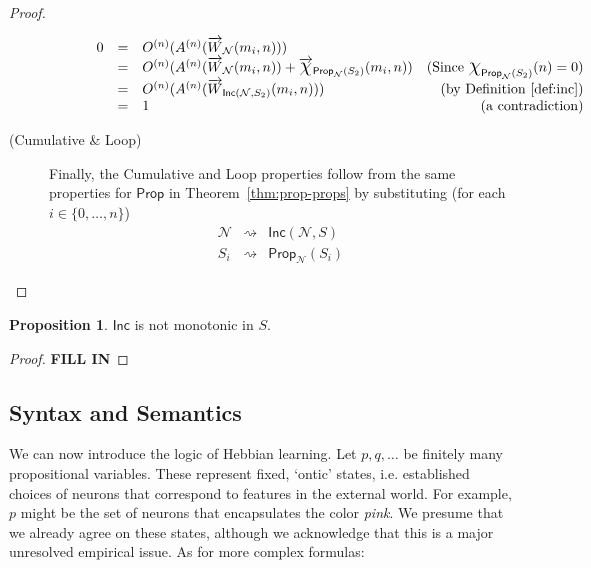 \documentclass[letterpaper]{article}
\theoremstyle{definition}
\newtheorem{proposition}{Proposition}
\newcommand{\set}[1]{\{ #1 \}}
\newcommand*{\bigchi}{\mbox{\Large$\chi$}}%
\newcommand{\Prop}{\textsf{Prop}}
\newcommand{\Inc}{\textsf{Inc}}
\newcommand{\Net}{\mathcal{N}}
\begin{document}
\begin{proof}
\begin{description}
\begin{description}
\[\begin{array}{lclr}
    0 & = & O^{(n)}(A^{(n)}(\overrightarrow{W}_{\Net}(m_i, n))) & 
    \\
    
    & = & O^{(n)}(A^{(n)}(\overrightarrow{W}_{\Net}(m_i, n)) + \overrightarrow{\bigchi}_{\Prop_{\Net}(S_2)}(m_i, n)) & 
    \mbox{(Since } \bigchi_{\Prop_\Net(S_2)}(n) = 0)\\
    
    & = & O^{(n)}(A^{(n)}(\overrightarrow{W}_{\Inc(\Net, S_2)}(m_i, n))) & 
    \mbox{(by Definition~\ref{def:inc})}\\
    
    & = & 1 & \mbox{(a contradiction)}
    \end{array}
    \]
    \end{description}
    
    \item[(Cumulative \& Loop)] Finally, the Cumulative and Loop properties follow from the same properties for $\Prop$ in Theorem~\ref{thm:prop-props} by substituting (for each $i \in \set{0, \ldots, n}$)
    \[
    \begin{array}{lcl}
    
    \Net & \rightsquigarrow & \Inc(\Net, S)\\
    S_i & \rightsquigarrow & \Prop_\Net(S_i)
    
    \end{array}
    \]
\end{description}
\end{proof}

\begin{proposition}
$\Inc$ is not monotonic in $S$.
\end{proposition}  
\begin{proof}
\textbf{\textcolor{myred}{FILL IN}}
\end{proof}

\subsection{Syntax and Semantics}

We can now introduce the logic of Hebbian learning.  Let $p, q, \ldots$ be finitely many propositional variables.  These represent fixed, `ontic' states, i.e. established choices of neurons that correspond to features in the external world.  For example, $p$ might be the set of neurons that encapsulates the color \emph{pink}.  We presume that we already agree on these states, although we acknowledge that this is a major unresolved empirical issue.  As for more complex formulas:
\end{document}
